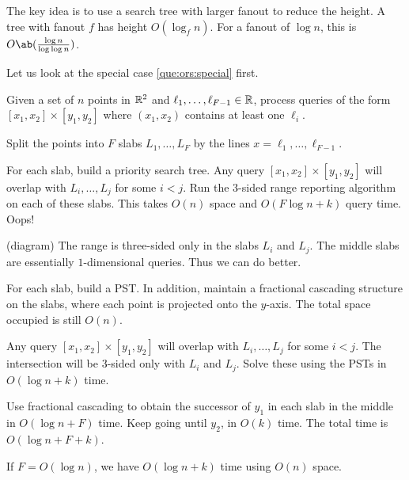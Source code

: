 The key idea is to use a search tree with larger fanout to reduce
the height.
A tree with fanout $f$ has height $O(\log_f n)$.
For a fanout of $\log n$, this is $O\ab(\frac{\log n}{\log \log n})$.

Let us look at the special case \cref{que:ors:special} first.
\begin{question*}
    Given a set of $n$ points in $\mathbb{R}^2$ and
    $\ell_1, \dots, \ell_{F-1} \in \mathbb{R}$,
    process queries of the form $[x_1, x_2] \times [y_1, y_2]$
    where $(x_1, x_2)$ contains at least one $\ell_i$.
\end{question*}
\begin{solution}
    Split the points into $F$ slabs $L_1, \dots, L_F$
    by the lines $x = \ell_1, \dots, \ell_{F-1}$.

    For each slab, build a priority search tree.
    Any query $[x_1, x_2] \times [y_1, y_2]$ will overlap with
    $L_i, \dots, L_j$ for some $i < j$.
    Run the 3-sided range reporting algorithm on each of these slabs.
    This takes $O(n)$ space and $O(F \log n + k)$ query time.
    Oops!
\end{solution}
(diagram) The range is three-sided only in the slabs $L_i$ and $L_j$.
The middle slabs are essentially $1$-dimensional queries.
Thus we can do better.

\begin{solution}
    For each slab, build a PST.
    In addition, maintain a fractional cascading structure on the slabs,
    where each point is projected onto the $y$-axis.
    The total space occupied is still $O(n)$.

    Any query $[x_1, x_2] \times [y_1, y_2]$ will overlap with
    $L_i, \dots, L_j$ for some $i < j$.
    The intersection will be 3-sided only with $L_i$ and $L_j$.
    Solve these using the PSTs in $O(\log n + k)$ time.

    Use fractional cascading to obtain the successor of $y_1$ in each
    slab in the middle in $O(\log n + F)$ time.
    Keep going until $y_2$, in $O(k)$ time.
    The total time is $O(\log n + F + k)$.
\end{solution}
If $F = O(\log n)$, we have $O(\log n + k)$ time using $O(n)$ space.

